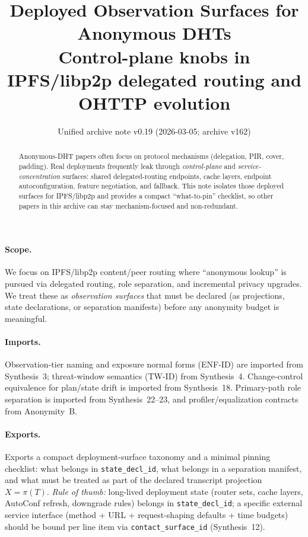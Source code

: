 \documentclass[11pt]{article}
\title{Deployed Observation Surfaces for Anonymous DHTs\\
\large Control-plane knobs in IPFS/libp2p delegated routing and OHTTP evolution}
\author{}
\date{Unified archive note v0.19 (2026-03-05; archive v162)}
\begin{document}
\maketitle

\begin{abstract}
Anonymous-DHT papers often focus on protocol mechanisms (delegation, PIR, cover, padding).
Real deployments frequently leak through \emph{control-plane} and \emph{service-concentration} surfaces: shared delegated-routing endpoints, cache layers, endpoint autoconfiguration, feature negotiation, and fallback.
This note isolates those deployed surfaces for IPFS/libp2p and provides a compact ``what-to-pin'' checklist, so other papers in this archive can stay mechanism-focused and non-redundant.
\end{abstract}

\paragraph{Scope.}
We focus on IPFS/libp2p content/peer routing where ``anonymous lookup'' is pursued via delegated routing, role separation, and incremental privacy upgrades.
We treat these as \emph{observation surfaces} that must be declared (as projections, state declarations, or separation manifests) before any anonymity budget is meaningful.

\paragraph{Imports.}
Observation-tier naming and exposure normal forms (ENF-ID) are imported from Synthesis~3; threat-window semantics (TW-ID) from Synthesis~4.
Change-control equivalence for plan/state drift is imported from Synthesis~18.
Primary-path role separation is imported from Synthesis~22--23, and profiler/equalization contracts from Anonymity~B.
\cite{series:traceifaces,series:threatwindows,series:planstateequiv,series:primarysepmanifest,series:probsep,series:profiling}

\paragraph{Exports.}
Exports a compact deployment-surface taxonomy and a minimal pinning checklist: what belongs in \texttt{state\_decl\_id}, what belongs in a separation manifest, and what must be treated as part of the declared transcript projection $X=\pi(T)$.
\emph{Rule of thumb:} long-lived deployment state (router sets, cache layers, AutoConf refresh, downgrade rules) belongs in \texttt{state\_decl\_id}; a specific external service interface (method + URL + request-shaping defaults + time budgets) should be bound per line item via \texttt{contact\_surface\_id} (Synthesis~12).\cite{series:receiptitems}
\end{document}
